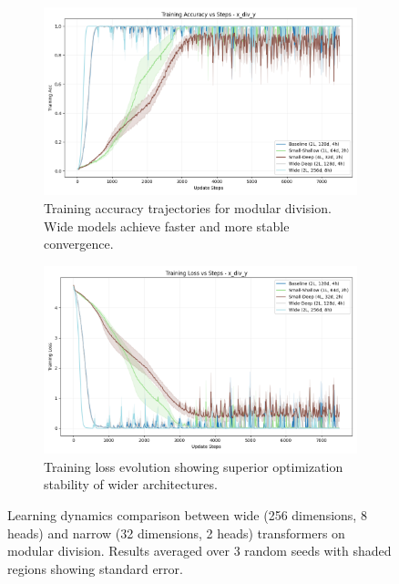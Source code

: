 \documentclass{article} %
\begin{document}
\begin{figure}[h]
    \centering
    \begin{subfigure}{0.49\textwidth}
        \includegraphics[width=\textwidth]{train_acc_x_div_y.png}
        \caption{Training accuracy trajectories for modular division. Wide models achieve faster and more stable convergence.}
        \label{fig:div_acc}
    \end{subfigure}
    \hfill
    \begin{subfigure}{0.49\textwidth}
        \includegraphics[width=\textwidth]{train_loss_x_div_y.png}
        \caption{Training loss evolution showing superior optimization stability of wider architectures.}
        \label{fig:div_loss}
    \end{subfigure}
    \caption{Learning dynamics comparison between wide (256 dimensions, 8 heads) and narrow (32 dimensions, 2 heads) transformers on modular division. Results averaged over 3 random seeds with shaded regions showing standard error.}
    \label{fig:first_figure}
\end{figure}
\end{document}
